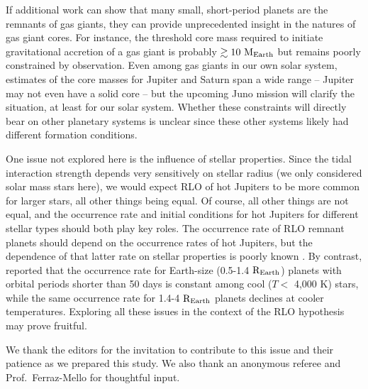 \documentclass{svjour3}                     %
\begin{document}
If additional work can show that many small, short-period planets are the remnants of gas giants, they can provide unprecedented insight in the natures of gas giant cores. For instance, the threshold core mass required to initiate gravitational accretion of a gas giant is probably $\gtrsim 10\ {\rm M_{Earth}}$ \cite{2014A&A...572A.107L} but remains poorly constrained by observation. Even among gas giants in our own solar system, estimates of the core masses for Jupiter and Saturn span a wide range -- Jupiter may not even have a solid core \cite{2010SSRv..152..423F} -- but the upcoming Juno mission will clarify the situation, at least for our solar system. Whether these constraints will directly bear on other planetary systems is unclear since these other systems likely had different formation conditions. 

One issue not explored here is the influence of stellar properties. Since the tidal interaction strength depends very sensitively on stellar radius (we only considered solar mass stars here), we would expect RLO of hot Jupiters to be more common for larger stars, all other things being equal. Of course, all other things are not equal, and the occurrence rate and initial conditions for hot Jupiters for different stellar types should both play key roles. The occurrence rate of RLO remnant planets should depend on the occurrence rates of hot Jupiters, but the dependence of that latter rate on stellar properties is poorly known \cite{2015ApJ...799..229W}. By contrast, \cite{2013ApJ...767...95D} reported that the occurrence rate for Earth-size (0.5-1.4 ${\rm R_{Earth}}$) planets with orbital periods shorter than 50 days is constant among cool ($T <$ 4,000 K) stars, while the same occurrence rate for 1.4-4 ${\rm R_{Earth}}$ planets declines at cooler temperatures. Exploring all these issues in the context of the RLO hypothesis may prove fruitful.

\begin{acknowledgements}
We thank the editors for the invitation to contribute to this issue and their patience as we prepared this study. We also thank an anonymous referee and Prof.\ Ferraz-Mello for thoughtful input.
\end{acknowledgements}


%
%
\end{document}
